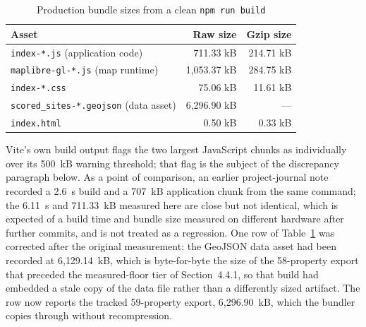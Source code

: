 \documentclass[12pt,letterpaper]{report}
\begin{document}
\begin{table}[htbp]
\centering
\begin{tabular}{lrr}
\toprule
Asset & Raw size & Gzip size \\
\midrule
\texttt{index-*.js} (application code) & 711.33 kB & 214.71 kB \\
\texttt{maplibre-gl-*.js} (map runtime) & 1{,}053.37 kB & 284.75 kB \\
\texttt{index-*.css} & 75.06 kB & 11.61 kB \\
\texttt{scored\_sites-*.geojson} (data asset) & 6{,}296.90 kB & --- \\
\texttt{index.html} & 0.50 kB & 0.33 kB \\
\bottomrule
\end{tabular}
\caption{Production bundle sizes from a clean \texttt{npm run build}}
\label{tab:m2-bundle}
\end{table}

Vite's own build output flags the two largest JavaScript chunks as
individually over its 500~kB warning threshold; that flag is the subject
of the discrepancy paragraph below. As a point of comparison, an earlier
project-journal note recorded a 2.6~s build and a 707~kB application
chunk from the same command; the 6.11~s and 711.33~kB measured here are
close but not identical, which is expected of a build time and bundle
size measured on different hardware after further commits, and is not
treated as a regression. One row of Table~\ref{tab:m2-bundle} was corrected
after the original measurement: the GeoJSON data asset had been recorded at
6{,}129.14~kB, which is byte-for-byte the size of the 58-property export that
preceded the measured-floor tier of Section~4.4.1, so that build had embedded
a stale copy of the data file rather than a differently sized artifact. The
row now reports the tracked 59-property export, 6{,}296.90~kB, which the
bundler copies through without recompression.
\end{document}

